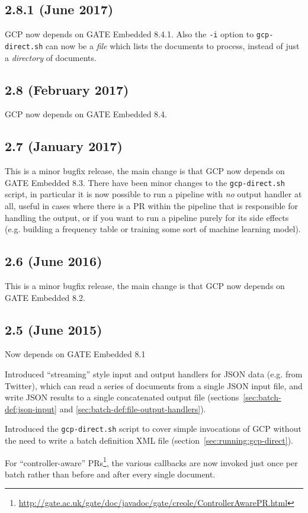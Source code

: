 \subsection{2.8.1 (June 2017)}

GCP now depends on GATE Embedded 8.4.1.  Also the \verb!-i! option to
\verb!gcp-direct.sh! can now be a \emph{file} which lists the documents to
process, instead of just a \emph{directory} of documents.

\subsection{2.8 (February 2017)}

GCP now depends on GATE Embedded 8.4.

\subsection{2.7 (January 2017)}

This is a minor bugfix release, the main change is that GCP now depends on GATE
Embedded 8.3.  There have been minor changes to the \verb!gcp-direct.sh! script,
in particular it is now possible to run a pipeline with \emph{no} output
handler at all, useful in cases where there is a PR within the pipeline that is
responsible for handling the output, or if you want to run a pipeline purely
for its side effects (e.g. building a frequency table or training some sort of
machine learning model).

\subsection{2.6 (June 2016)}

This is a minor bugfix release, the main change is that GCP now depends on GATE
Embedded 8.2.

\subsection{2.5 (June 2015)}

\bit
\item Now depends on GATE Embedded 8.1
\item Introduced ``streaming'' style input and output handlers for JSON
  data (e.g. from Twitter), which can read a series of documents from
  a single JSON input file, and write JSON results to a single concatenated
  output file (sections~\ref{sec:batch-def:json-input} and
  \ref{sec:batch-def:file-output-handlers}).
\item Introduced the \verb!gcp-direct.sh! script to cover simple invocations
  of GCP without the need to write a batch definition XML file
  (section~\ref{sec:running:gcp-direct}).
\item For ``controller-aware''
  PRs\footnote{\url{http://gate.ac.uk/gate/doc/javadoc/gate/creole/ControllerAwarePR.html}},
  the various callbacks are now invoked just once per batch rather than before
  and after every single document.
\eit

